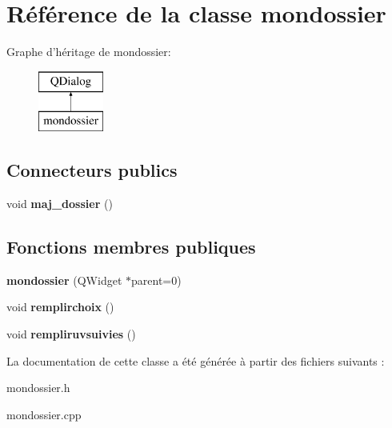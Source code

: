 \hypertarget{classmondossier}{\section{Référence de la classe mondossier}
\label{classmondossier}
}
Graphe d'héritage de mondossier\+:\begin{figure}[H]
\begin{center}
\leavevmode
\includegraphics[height=2.000000cm]{classmondossier}
\end{center}
\end{figure}
\subsection*{Connecteurs publics}
\begin{DoxyCompactItemize}
\item 
\hypertarget{classmondossier_ab6c2f44ffadf1a30d025e0e2fef32f68}{void {\bfseries maj\+\_\+dossier} ()}\label{classmondossier_ab6c2f44ffadf1a30d025e0e2fef32f68}

\end{DoxyCompactItemize}
\subsection*{Fonctions membres publiques}
\begin{DoxyCompactItemize}
\item 
\hypertarget{classmondossier_a79af90264af161c9d8bb34e53b17f464}{{\bfseries mondossier} (Q\+Widget $\ast$parent=0)}\label{classmondossier_a79af90264af161c9d8bb34e53b17f464}

\item 
\hypertarget{classmondossier_ac434ae06e3bf4021952d5d649529190b}{void {\bfseries remplirchoix} ()}\label{classmondossier_ac434ae06e3bf4021952d5d649529190b}

\item 
\hypertarget{classmondossier_ad82e53838f6ff329bfa24ea1236ab32d}{void {\bfseries rempliruvsuivies} ()}\label{classmondossier_ad82e53838f6ff329bfa24ea1236ab32d}

\end{DoxyCompactItemize}


La documentation de cette classe a été générée à partir des fichiers suivants \+:\begin{DoxyCompactItemize}
\item 
mondossier.\+h\item 
mondossier.\+cpp\end{DoxyCompactItemize}
